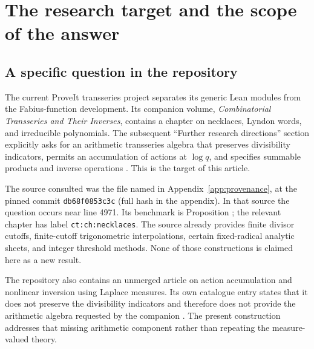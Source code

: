 \documentclass[11pt,a4paper]{article}
\numberwithin{equation}{section}
\theoremstyle{definition}
\theoremstyle{remark}
\begin{document}
\hypersetup{pageanchor=true}
{\small\setlength{\parskip}{0pt}\tableofcontents}
\newpage

\section{The research target and the scope of the answer}\label{sec:scope}

\subsection{A specific question in the repository}

The current ProveIt transseries project separates its generic Lean modules
from the Fabius-function development. Its companion volume,
\emph{Combinatorial Transseries and Their Inverses}, contains a chapter on
necklaces, Lyndon words, and irreducible polynomials. The subsequent
``Further research directions'' section explicitly asks for an arithmetic
transseries algebra that preserves divisibility indicators, permits an
accumulation of actions at $\log q$, and specifies summable products and
inverse operations \cite{repo}. This is the target of this article.

The source consulted was the file named in Appendix~\ref{app:provenance},
at the pinned commit \texttt{db68f0853c3c} (full hash in the appendix).
In that source the question occurs near
line 4971. Its benchmark is Proposition
; the relevant chapter has label
\texttt{ct:ch:necklaces}. The source already provides finite divisor cutoffs,
finite-cutoff trigonometric interpolations, certain fixed-radical analytic
sheets, and integer threshold methods. None of those constructions is
claimed here as a new result.

The repository also contains an unmerged article on action accumulation
and nonlinear inversion using Laplace measures. Its own catalogue entry
states that it does not preserve the divisibility indicators and therefore
does not provide the arithmetic algebra requested by the companion
\cite{repoindex}. The present construction addresses that missing
arithmetic component rather than repeating the measure-valued theory.
\end{document}
